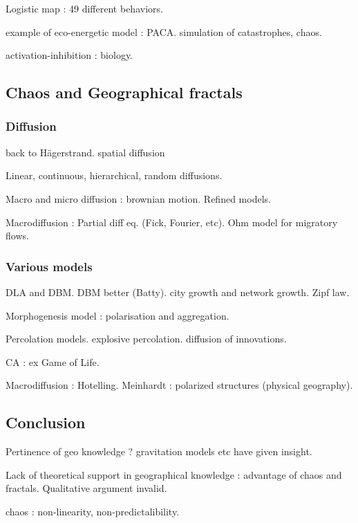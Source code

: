 Logistic map : 49 different behaviors.

example of eco-energetic model : PACA. simulation of catastrophes, chaos.

activation-inhibition : biology.

\subsection{Chaos and Geographical fractals}

\subsubsection{Diffusion}

back to Hägerstrand. spatial diffusion

Linear, continuous, hierarchical, random diffusions.

Macro and micro diffusion : brownian motion. Refined models.

Macrodiffusion : Partial diff eq. (Fick, Fourier, etc). Ohm model for migratory flows.

\subsubsection{Various models}

DLA and DBM. DBM better (Batty). city growth and network growth. Zipf law.

Morphogenesis model : polarisation and aggregation.

Percolation models. explosive percolation. diffusion of innovations.

CA : ex Game of Life.

Macrodiffusion : Hotelling. Meinhardt : polarized structures (physical geography).

\subsection*{Conclusion}

Pertinence of geo knowledge ? gravitation models etc have given insight.

Lack of theoretical support in geographical knowledge : advantage of chaos and fractals. Qualitative argument invalid.

chaos : non-linearity, non-predictalibility.















